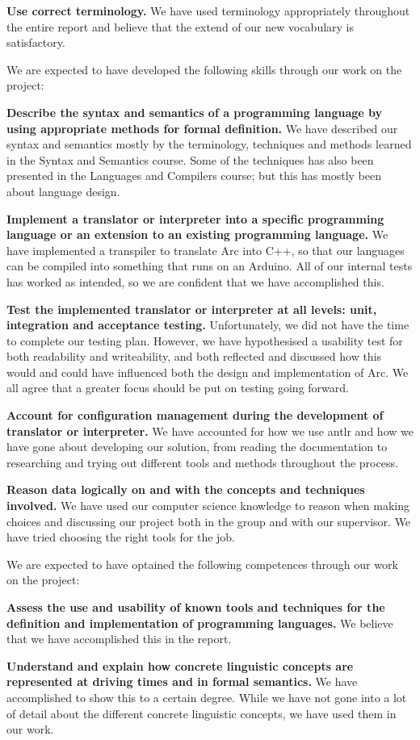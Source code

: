 \textbf{Use correct terminology.} We have used terminology appropriately throughout the entire report and believe that the extend of our new vocabulary is satisfactory.

We are expected to have developed the following skills through our work on the project:

\textbf{Describe the syntax and semantics of a programming language by using appropriate methods for formal definition.} We have described our syntax and semantics mostly by the terminology, techniques and methods learned in the Syntax and Semantics course. Some of the techniques has also been presented in the Languages and Compilers course; but this has mostly been about language design.

\textbf{Implement a translator or interpreter into a specific programming language or an extension to an existing programming language.} We have implemented a transpiler to translate Arc into C++, so that our languages can be compiled into something that runs on an Arduino. All of our internal tests has worked as intended, so we are confident that we have accomplished this.

\textbf{Test the implemented translator or interpreter at all levels: unit, integration and acceptance testing.} Unfortunately, we did not have the time to complete our testing plan. However, we have hypothesised a usability test for both readability and writeability, and both reflected and discussed how this would and could have influenced both the design and implementation of Arc. We all agree that a greater focus should be put on testing going forward.

\textbf{Account for configuration management during the development of translator or interpreter.} We have accounted for how we use \gls{antlr} and how we have gone about developing our solution, from reading the documentation to researching and trying out different tools and methods throughout the process.

\textbf{Reason data logically on and with the concepts and techniques involved.} We have used our computer science knowledge to reason when making choices and discussing our project both in the group and with our supervisor. We have tried choosing the right tools for the job.

We are expected to have optained the following competences through our work on the project:

\textbf{Assess the use and usability of known tools and techniques for the definition and implementation of programming languages.} We believe that we have accomplished this in the report.

\textbf{Understand and explain how concrete linguistic concepts are represented at driving times and in formal semantics.} We have accomplished to show this to a certain degree. While we have not gone into a lot of detail about the different concrete linguistic concepts, we have used them in our work.

